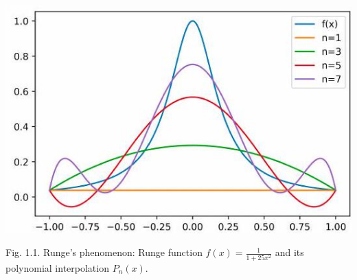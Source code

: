 \documentclass[10pt]{article}
\begin{document}
\includegraphics[max width=\textwidth]{2022_01_05_fba364634dde0bb701e1g-6}

Fig. 1.1. Runge's phenomenon: Runge function $f(x)=\frac{1}{1+25 x^{2}}$ and its polynomial interpolation $P_{n}(x)$.
\end{document}
